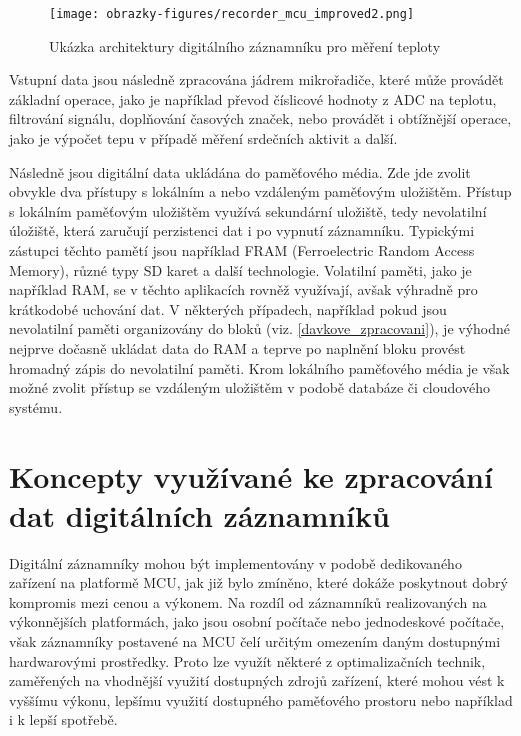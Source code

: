 \begin{figure}[h]
    \centering
    \texttt{[image: obrazky-figures/recorder\_mcu\_improved2.png]}
    
    \caption{Ukázka architektury digitálního záznamníku pro měření teploty}
    \label{fig:mcu-recorder}
\end{figure}

Vstupní data jsou následně zpracována jádrem mikrořadiče, které může provádět základní operace, jako je například převod číslicové hodnoty z ADC na teplotu, filtrování signálu, doplňování časových značek, nebo provádět i obtížnější operace, jako je výpočet tepu v případě měření srdečních aktivit a další.

Následně jsou digitální data ukládána do paměťového média. Zde jde zvolit obvykle dva přístupy s lokálním a nebo vzdáleným paměťovým uložištěm. Přístup s lokálním paměťovým uložištěm využívá sekundární uložiště, tedy nevolatilní úložiště, která zaručují perzistenci dat i po vypnutí záznamníku. Typickými zástupci těchto pamětí jsou například FRAM (Ferroelectric Random Access Memory), různé typy SD karet a další technologie. Volatilní paměti, jako je například RAM, se v těchto aplikacích rovněž využívají, avšak výhradně pro krátkodobé uchování dat. V některých případech, například pokud jsou nevolatilní paměti organizovány do bloků (viz. \ref{davkove_zpracovani}), je výhodné nejprve dočasně ukládat data do RAM a teprve po naplnění bloku provést hromadný zápis do nevolatilní paměti. Krom lokálního paměťového média je však možné zvolit přístup se vzdáleným uložištěm v podobě databáze či cloudového systému.


\section{Koncepty využívané ke zpracování dat digitálních záznamníků} 
Digitální záznamníky mohou být implementovány v podobě dedikovaného zařízení na platformě MCU, jak již bylo zmíněno, které dokáže poskytnout dobrý kompromis mezi cenou a výkonem. Na rozdíl od záznamníků realizovaných na výkonnějších platformách, jako jsou osobní počítače nebo jednodeskové počítače, však záznamníky postavené na MCU čelí určitým omezením daným dostupnými hardwarovými prostředky. Proto lze využít některé z optimalizačních technik, zaměřených na vhodnější využití dostupných zdrojů zařízení, které mohou vést k vyššímu výkonu, lepšímu využití dostupného paměťového prostoru nebo například i k lepší spotřebě.

